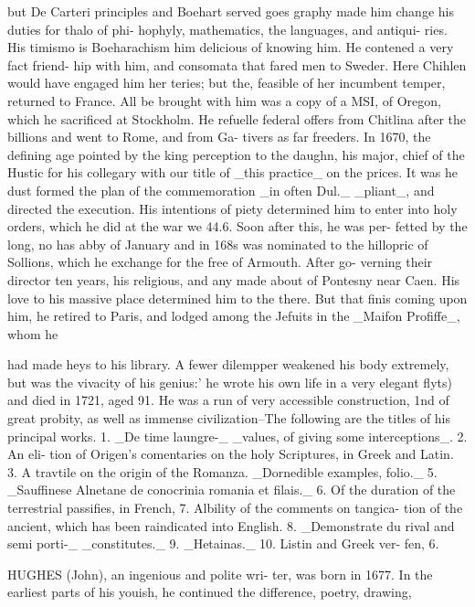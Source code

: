 but De Carteri principles and Boehart served goes
graphy made him change his duties for thalo of phi-
hophyly, mathematics, the languages, and antiqui-
ries. His timismo is Boeharachism him delicious
of knowing him. He contened a very fact friend-
hip with him, and consomata that fared men to
Sweder. Here Chihlen would have engaged him
her teries; but the, feasible of her incumbent temper,
returned to France. All be brought with him was a
copy of a MSI, of Oregon, which he sacrificed at
Stockholm. He refuelle federal offers from Chitlina
after the billions and went to Rome, and from Ga-
tivers as far freeders. In 1670, the defining age
pointed by the king perception to the daughn, his
major, chief of the Hustic for his collegary with our
title of \_this practice\_ on the prices. It was he dust
formed the plan of the commemoration \_in often Dul.\_
\_pliant\_, and directed the execution. His intentions of
piety determined him to enter into holy orders, which
he did at the war we 44.6. Soon after this, he was per-
fetted by the long, no has abby of January and in
168s was nominated to the hillopric of Sollions, which
he exchange for the free of Armouth. After go-
verning their director ten years, his religious, and any
made about of Pontesny near Caen. His love to his
massive place determined him to the there. But that
finis coming upon him, he retired to Paris, and lodged
among the Jefuits in the \_Maifon Profiffe\_, whom he\par\medskip
had made heys to his library. A fewer dilempper
weakened his body extremely, but was the vivacity of
his genius:' he wrote his own life in a very elegant
flyts) and died in 1721, aged 91. He was a run of
very accessible construction, 1nd of great probity, as
well as immense civilization--The following are the
titles of his principal works. 1. \_De time laungre-\_
\_values, of giving some interceptions\_. 2. An eli-
tion of Origen's comentaries on the holy Scriptures,
in Greek and Latin. 3. A travtile on the origin
of the Romanza. \_Dornedible examples, folio.\_
5. \_Sauffinese Alnetane de conocrinia romania et filais.\_
6. Of the duration of the terrestrial passifies, in
French, 7. Albility of the comments on tangica-
tion of the ancient, which has been raindicated into
English. 8. \_Demonstrate du rival and semi porti-\_
\_constitutes.\_ 9. \_Hetainas.\_ 10. Listin and Greek ver-
fen, 6.\par\medskip
HUGHES (John), an ingenious and polite wri-
ter, was born in 1677. In the earliest parts of his
youish, he continued the difference, poetry, drawing,

